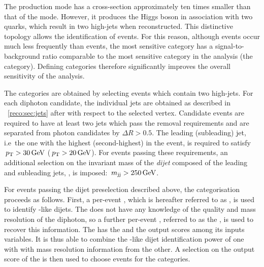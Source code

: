 The \VBF production mode has a cross-section approximately ten times smaller than that of the \ggH mode. However, it produces the Higgs boson in association with two quarks, which result in two high-\pT jets when reconstructed. This distinctive topology allows the identification of \VBF events. For this reason, although \VBF events occur much less frequently than \ggH events, the most sensitive \VBFTag category has a signal-to-background ratio comparable to the most sensitive category in the analysis (the  category). Defining \VBFTag categories therefore significantly improves the overall sensitivity of the analysis.

The \VBFTag categories are obtained by selecting events which contain two high-\pT jets. For each diphoton candidate, the individual jets are obtained as described in \Sec~\ref{reco:sec:jets} after \PFCHS with respect to the selected vertex. Candidate \VBFTag events are required to have at least two jets which pass the \PU removal requirements and are separated from \PF photon candidates by $\Delta R > 0.5$. The leading (subleading) jet, i.e~the one with the highest (second-highest) \pT in the event, is required to satisfy $\,p_\text{T} > 30 \,\text{Ge\hspace{-.08em}V}$ ($\,p_\text{T} > 20 \,\text{Ge\hspace{-.08em}V}$). For events passing these requirements, an additional selection on the invariant mass of the \emph{dijet} composed of the leading and subleading jets, \mjj, is imposed: $\,m_\text{jj} > 250\,\text{Ge\hspace{-.08em}V}$. %

For events passing the dijet preselection described above, the \VBFTag categorisation proceeds as follows. First, a per-event \BDT, which is hereafter referred to as \DiJetBdt, is used to identify \VBF-like dijets. %
The \DiJetBdt does not have any knowledge of the quality and mass resolution of the diphoton, so a further per-event \BDT, referred to as the \DiPhoDiJetBdt, is used to recover this information. The \DiPhoDiJetBdt has the \DiPhoBdt and the \DiJetBdt output scores among its inputs variables. It is thus able to combine the \VBF-like dijet identification power of one \BDT with with mass resolution information from the other. %
A selection on the output score of the \DiPhoDiJetBdt is then used to choose events for the \VBFTag categories.

